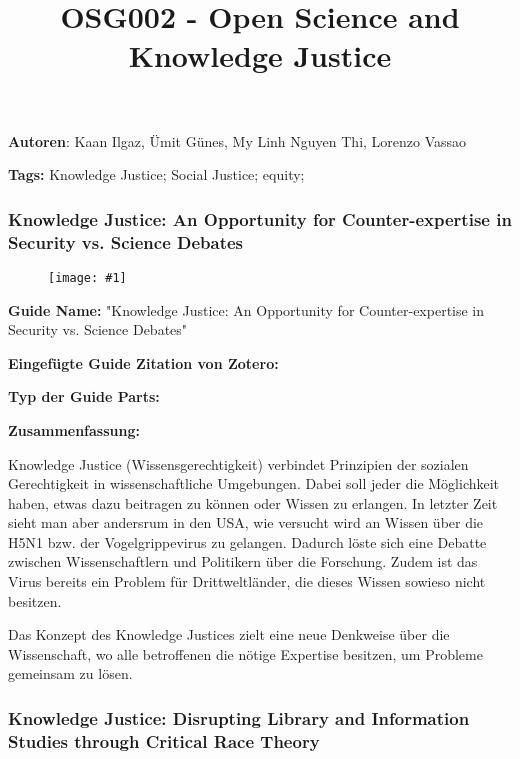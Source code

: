 \documentclass{article}
\newlength{\imgwidth}
\newcommand\scaledgraphics[2]{%
                
\settowidth{\imgwidth}{\texttt{[image: \#1]}}%
                
\setlength{\imgwidth}{\minof{\imgwidth}{#2\textwidth}}%
                
\texttt{[image: \#1]}%
                
}
\begin{document}
\title{OSG002 - Open Science and Knowledge Justice}

\maketitle




\textbf{Autoren}: Kaan Ilgaz, Ümit Günes, My Linh Nguyen Thi, Lorenzo Vassao

\textbf{Tags:} Knowledge Justice; Social Justice; equity;


\subsubsection{Knowledge Justice: An Opportunity for Counter-expertise in Security vs. Science Debates}\label{H870315}


\begin{figure}
\scaledgraphics{086e7cc2-fafd-4cc2-8c8f-018ac3a9884d.png}{1}
\label{F24704971}
\end{figure}





\textbf{Guide Name:} "Knowledge Justice: An Opportunity for Counter-expertise in Security vs. Science Debates"


\textbf{Eingefügte Guide Zitation von Zotero:} \autocite{r_egert_knowledge_2017}


\textbf{Typ der Guide Parts:} 


\textbf{Zusammenfassung:}

Knowledge Justice (Wissensgerechtigkeit) verbindet Prinzipien der sozialen Gerechtigkeit in wissenschaftliche Umgebungen. Dabei soll jeder die Möglichkeit haben, etwas dazu beitragen zu können oder Wissen zu erlangen. In letzter Zeit sieht man aber andersrum in den USA, wie versucht wird an Wissen über die H5N1 bzw. der Vogelgrippevirus zu gelangen. Dadurch löste sich eine Debatte zwischen Wissenschaftlern und Politikern über die Forschung. Zudem ist das Virus bereits ein Problem für Drittweltländer, die dieses Wissen sowieso nicht besitzen.


Das Konzept des Knowledge Justices zielt eine neue Denkweise über die Wissenschaft, wo alle betroffenen die nötige Expertise besitzen, um Probleme gemeinsam zu lösen.


\subsubsection{Knowledge Justice: Disrupting Library and Information Studies through Critical Race Theory}\label{H8244312}
\end{document}
